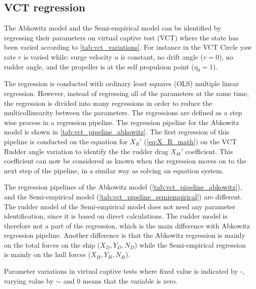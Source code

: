 \subsection{VCT regression}
\label{sec:VCT_regression}
The Abkowitz model and the Semi-empirical model can be identified by regressing their parameters on virtual captive test (VCT) where the state has been varied according to \autoref{tab:vct_variations}. For instance in the VCT Circle yaw rate $r$ is varied while: surge velocity $u$ is constant, no drift angle ($v=0$), no rudder angle, and the propeller is at the self propulsion point ($\eta_0=1$).

The regression is conducted with ordinary least squares (OLS) multiple linear regression. However, instead of regressing all of the parameters at the same time, the regression is divided into many regressions in order to reduce the multicollinearity between the parameters. The regressions are defined as a step wise process in a regression pipeline. The regression pipeline for the Abkowitz model is shown in \autoref{tab:vct_pipeline_abkowitz}. The first regression of this pipeline is conducted on the equation for ${X_R}'$ (\autoref{eq:X_R_math}) on the VCT Rudder angle variation to identify the the rudder drag ${X_{\delta\delta}}'$ coefficient. This coefficient can now be considered as known when the regression moves on to the next step of the pipeline, in a similar way as solving an equation system.

The regression pipelines of the Abkowitz model (\autoref{tab:vct_pipeline_abkowitz}), and the Semi-empirical model (\autoref{tab:vct_pipeline_semiempirical}) are different. The rudder model of the Semi-empirical model does not need any parameter identification, since it is based on direct calculations. The rudder model is therefore not a part of the regression, which is the main difference with Abkowitz regression pipeline. Another difference is that the Abkowitz regression is mainly on the total forces on the ship ($X_D,Y_D,N_D$) while the Semi-empirical regression is mainly on the hull forces ($X_H,Y_H,N_H$).

\begin{table}[h!]
    \centering
    \caption{Parameter variations in virtual captive tests where fixed value is indicated by -, varying value by $\sim$ and 0 means that the variable is zero.}
    \label{tab:vct_variations}
\end{table}

